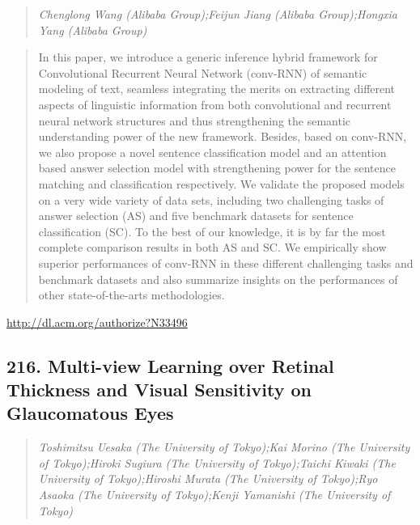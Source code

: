 \documentclass{article}
\begin{document}
\begin{quote}
\footnotesize{\textit{Chenglong Wang (Alibaba Group);Feijun Jiang (Alibaba Group);Hongxia Yang (Alibaba Group)}}

\end{quote}

\begin{quote}
In this paper, we introduce a generic inference hybrid framework for Convolutional Recurrent Neural Network (conv-RNN) of semantic modeling of text, seamless integrating the merits on extracting different aspects of linguistic information from both convolutional and recurrent neural network structures and thus strengthening the semantic understanding power of the new framework. Besides, based on conv-RNN, we also propose a novel sentence classification model and an attention based answer selection model with strengthening power for the sentence matching and classification respectively. We validate the proposed models on a very wide variety of data sets, including two challenging tasks of answer selection (AS) and five benchmark datasets for sentence classification (SC). To the best of our knowledge, it is by far the most complete comparison results in both AS and SC. We empirically show superior performances of conv-RNN in these different challenging tasks and benchmark datasets and also summarize insights on the performances of other state-of-the-arts methodologies.
\end{quote}

\href{http://dl.acm.org/authorize?N33496}{http://dl.acm.org/authorize?N33496}

\subsection{216. Multi-view Learning over Retinal Thickness and Visual Sensitivity on Glaucomatous Eyes}

\begin{quote}
\footnotesize{\textit{Toshimitsu Uesaka (The University of Tokyo);Kai Morino (The University of Tokyo);Hiroki Sugiura (The University of Tokyo);Taichi Kiwaki (The University of Tokyo);Hiroshi Murata (The University of Tokyo);Ryo Asaoka (The University of Tokyo);Kenji Yamanishi (The University of Tokyo)}}

\end{quote}
\end{document}
